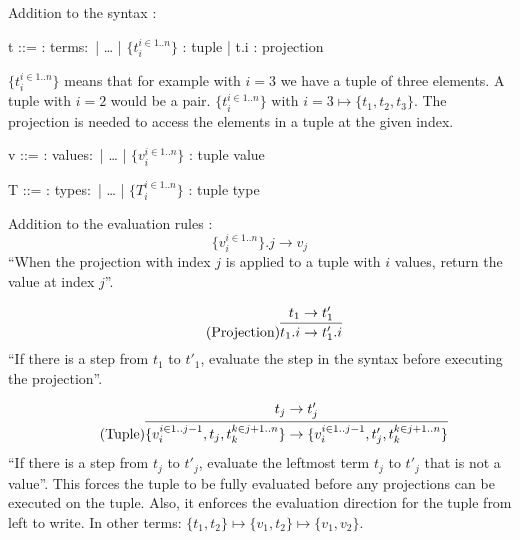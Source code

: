 Addition to the syntax \cite{pierce2002ProgLang}:
\begin{bnfgrammar}
    t ::= : terms$\colon$
    | \dots
    | $\{t_i^{i \in 1..n}\}$ : tuple
    | t.i : projection
\end{bnfgrammar}\leavevmode\newline
$\{t_i^{i \in 1..n}\}$ means that for example with $i=3$ we have a tuple
of three elements. A tuple with $i=2$ would be a pair.
$\{t_i^{i \in 1..n}\} \text{ with } i=3 \mapsto \{t_1, t_2, t_3\}$.
The projection is needed to access the elements in a tuple at the given index.

\begin{bnfgrammar}
    v ::= : values$\colon$
    | \dots
    | $\{v_i^{i \in 1..n}\}$ : tuple value
\end{bnfgrammar}\leavevmode\newline

\begin{bnfgrammar}
    T ::= : types$\colon$
    | \dots
    | $\{T_i^{i \in 1..n}\}$ : tuple type
\end{bnfgrammar}\leavevmode\newline

Addition to the evaluation rules \cite{pierce2002ProgLang}:
\begin{equation*}
    \tag{Tuple projection}
    \{v_i^{i \in 1..n}\} . j \rightarrow v_j
\end{equation*}
``When the projection with index $j$ is applied to a tuple with
$i$ values, return the value at index $j$''.

\begin{equation*}
    \tag{Projection}
    \infer{
        t_1 . i \rightarrow t'_1 . i
    }{
        t_1 \rightarrow t'_1
    }
\end{equation*}
``If there is a step from $t_1$ to $t'_1$, evaluate the step
in the syntax before executing the projection''.

\begin{equation*}
    \tag{Tuple}
    \infer{
    \{v_i^{i \in 1..j-1}, t_j, t_k^{k \in j+1..n}\} \rightarrow \{v_i^{i \in 1..j-1}, t'_j, t_k^{k \in j+1..n}\}
    }{
    t_j \rightarrow t'_j
    }
\end{equation*}
``If there is a step from $t_j$ to $t'_j$, evaluate the leftmost
term $t_j$ to $t'_j$ that is not a value''. This forces the tuple to
be fully evaluated before any projections can be executed on the tuple.
Also, it enforces the evaluation direction for the tuple from left to write.
In other terms: $\{t_1, t_2\} \mapsto \{v_1, t_2\} \mapsto \{v_1, v_2\}$.

